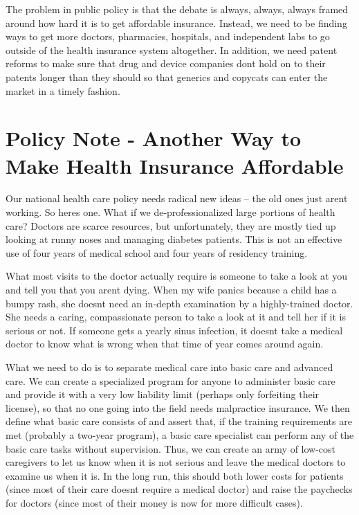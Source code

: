 The problem in public policy is that the debate is always, always,
always framed around how hard it is to get affordable insurance.
Instead, we need to be finding ways to get more doctors, pharmacies,
hospitals, and independent labs
to go outside of the
health insurance system altogether. In addition, we need patent reforms
to make sure that drug and device companies don{\textquotesingle}t hold
on to their patents longer than they should so that generics and
copycats can enter the market in a timely fashion.

\section{Policy Note - Another Way to Make Health Insurance Affordable}

Our national health
care policy needs radical new ideas – the old ones just
aren{\textquotesingle}t working.  So here{\textquotesingle}s one.  What
if we
de-professionalized
large portions of
health care? Doctors
are scarce resources, but unfortunately, they are mostly tied up
looking at runny noses and managing diabetes patients. This is not an
effective use of four years of medical school and four years of
residency training.

What most visits to the doctor actually require is someone to take a
look at you and tell you that you aren{\textquotesingle}t dying. When
my wife panics because a child has a bumpy rash, she
doesn{\textquotesingle}t need an in-depth examination by a
highly-trained doctor. She needs a caring, compassionate person to take
a look at it and tell her if it is serious or not. If someone gets a
yearly sinus infection, it doesn{\textquotesingle}t take a medical
doctor to know what is wrong when that time of year comes around again.

What we need to do is to separate medical care into {\textquotedbl}basic
care{\textquotedbl} and {\textquotedbl}advanced care.{\textquotedbl} We
can create a specialized program for anyone to administer
{\textquotedbl}basic care{\textquotedbl} and provide it with a very low
liability limit (perhaps only forfeiting their license), so that no one
going into the field needs malpractice insurance. We then define what
{\textquotedbl}basic care{\textquotedbl} consists of and assert that,
if the training requirements are met (probably a two-year program), a
basic care specialist can perform any of the basic care tasks without
supervision. Thus, we can create an army of low-cost caregivers to let
us know when it is not serious and leave the medical doctors to examine
us when it is. In the long run, this should both lower costs for
patients (since most of their care doesn{\textquotesingle}t require a
medical doctor) and raise the paychecks for doctors (since most of
their money is now for more difficult cases).

